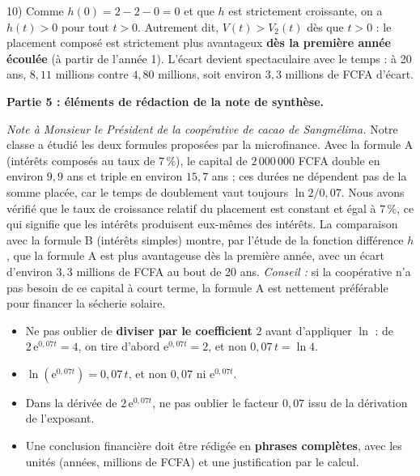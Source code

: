 \documentclass[11pt]{article}
\begin{document}
\begin{exoresolu}
10) Comme $h(0) = 2 - 2 - 0 = 0$ et que $h$ est strictement croissante, on a $h(t) > 0$ pour tout $t > 0$. Autrement dit, $V(t) > V_2(t)$ dès que $t > 0$ : le placement composé est strictement plus avantageux \textbf{dès la première année écoulée} (à partir de l'année 1). L'écart devient spectaculaire avec le temps : à 20 ans, $8{,}11$ millions contre $4{,}80$ millions, soit environ $3{,}3$ millions de FCFA d'écart.

\textbf{Partie 5 : éléments de rédaction de la note de synthèse.}

\emph{Note à Monsieur le Président de la coopérative de cacao de Sangmélima.} Notre classe a étudié les deux formules proposées par la microfinance. Avec la formule A (intérêts composés au taux de $7\,\%$), le capital de $2\,000\,000$ FCFA double en environ $9{,}9$ ans et triple en environ $15{,}7$ ans ; ces durées ne dépendent pas de la somme placée, car le temps de doublement vaut toujours $\ln 2 / 0{,}07$. Nous avons vérifié que le taux de croissance relatif du placement est constant et égal à $7\,\%$, ce qui signifie que les intérêts produisent eux-mêmes des intérêts. La comparaison avec la formule B (intérêts simples) montre, par l'étude de la fonction différence $h$, que la formule A est plus avantageuse dès la première année, avec un écart d'environ $3{,}3$ millions de FCFA au bout de 20 ans. \emph{Conseil :} si la coopérative n'a pas besoin de ce capital à court terme, la formule A est nettement préférable pour financer la sécherie solaire.
\end{exoresolu}

\begin{attention}
\begin{itemize}
\item Ne pas oublier de \textbf{diviser par le coefficient} $2$ avant d'appliquer $\ln$ : de $2\,\mathrm{e}^{0{,}07t}=4$, on tire d'abord $\mathrm{e}^{0{,}07t}=2$, et non $0{,}07\,t = \ln 4$.
\item $\ln(\mathrm{e}^{0{,}07t}) = 0{,}07\,t$, et non $0{,}07$ ni $\mathrm{e}^{0{,}07t}$.
\item Dans la dérivée de $2\,\mathrm{e}^{0{,}07t}$, ne pas oublier le facteur $0{,}07$ issu de la dérivation de l'exposant.
\item Une conclusion financière doit être rédigée en \textbf{phrases complètes}, avec les unités (années, millions de FCFA) et une justification par le calcul.
\end{itemize}
\end{attention}
\end{document}
